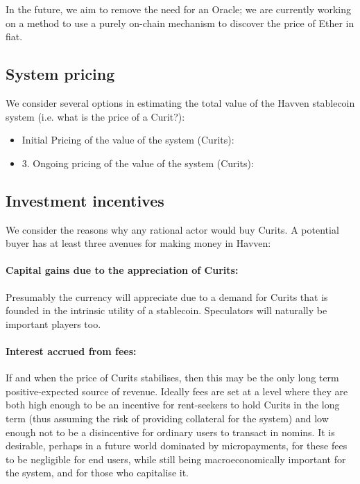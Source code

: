 \noindent In the future, we aim to remove the need for an Oracle; we are currently working on a method to use a purely on-chain mechanism to discover the price of Ether in fiat. \\

\subsection{System pricing}

We consider several options in estimating the total value of the Havven stablecoin system (i.e. what is the price of a Curit?):

\begin{itemize}
	\item Initial Pricing of the value of the system (Curits):
	\item 3. Ongoing pricing of the value of the system (Curits):
\end{itemize}

\subsection{Investment incentives}

We consider the reasons why any rational actor would buy Curits. A potential buyer has at least three avenues for making money in Havven:

\paragraph{Capital gains due to the appreciation of Curits:}
Presumably the currency will appreciate due to a demand for Curits that is founded in the intrinsic utility of a stablecoin. Speculators will naturally be important players too.

\paragraph{Interest accrued from fees:}
If and when the price of Curits stabilises, then this may be the only long term positive-expected source of revenue. Ideally fees are set at a level where they are both high enough to be an incentive for rent-seekers to hold Curits in the long term (thus assuming the risk of providing collateral for the system) and low enough not to be a disincentive for ordinary users to transact in nomins.
It is desirable, perhaps in a future world dominated by micropayments, for these fees to be negligible for end users, while still being macroeconomically important for the system, and for those who capitalise it.

